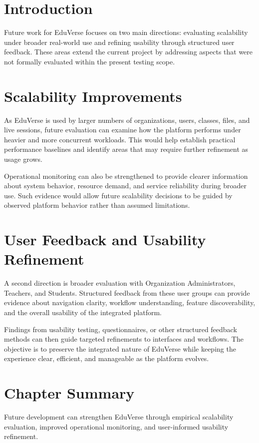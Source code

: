 
\section{Introduction}\label{sec:future_work_introduction}

Future work for EduVerse focuses on two main directions: evaluating scalability
under broader real-world use and refining usability through structured user
feedback. These areas extend the current project by addressing aspects that were
not formally evaluated within the present testing scope.

\section{Scalability Improvements}\label{sec:scalability_improvements}

As EduVerse is used by larger numbers of organizations, users, classes, files,
and live sessions, future evaluation can examine how the platform performs
under heavier and more concurrent workloads. This would help establish practical
performance baselines and identify areas that may require further refinement as
usage grows.

Operational monitoring can also be strengthened to provide clearer information
about system behavior, resource demand, and service reliability during broader
use. Such evidence would allow future scalability decisions to be guided by
observed platform behavior rather than assumed limitations.

\section{User Feedback and Usability Refinement}
\label{sec:user_feedback_usability_refinement}

A second direction is broader evaluation with Organization Administrators,
Teachers, and Students. Structured feedback from these user groups can provide
evidence about navigation clarity, workflow understanding, feature
discoverability, and the overall usability of the integrated platform.

Findings from usability testing, questionnaires, or other structured feedback
methods can then guide targeted refinements to interfaces and workflows. The
objective is to preserve the integrated nature of EduVerse while keeping the
experience clear, efficient, and manageable as the platform evolves.

\section{Chapter Summary}\label{sec:future_work_summary}

Future development can strengthen EduVerse through empirical scalability
evaluation, improved operational monitoring, and user-informed usability
refinement.